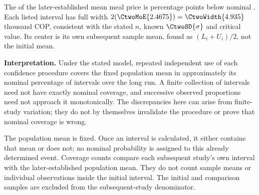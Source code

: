 The  of the later-established mean meal price is  percentage points below nominal . Each listed interval has full width $2(\CtwoMoE{2.4675})=\CtwoWidth{4.935}$ thousand COP, consistent with the stated $n$, known $\CtwoSD{\sigma}$ and critical value. Its center is its own subsequent sample mean, found as $(L_i+U_i)/2$, not the initial mean.

\textbf{Interpretation.} Under the stated model, repeated independent use of each confidence procedure covers the fixed population mean in approximately its nominal percentage of intervals over the long run. A finite collection of intervals need not have exactly nominal coverage, and successive observed proportions need not approach it monotonically. The discrepancies here can arise from finite-study variation; they do not by themselves invalidate the procedure or prove that nominal coverage is wrong.

The population mean is fixed. Once an interval is calculated, it either contains that mean or does not; no nominal probability is assigned to this already determined event. Coverage counts compare each subsequent study's own interval with the later-established population mean. They do not count sample means or individual observations inside the initial interval. The initial and comparison samples are excluded from the subsequent-study denominator.

\secInicio[][sec:p3]

\clearpage

